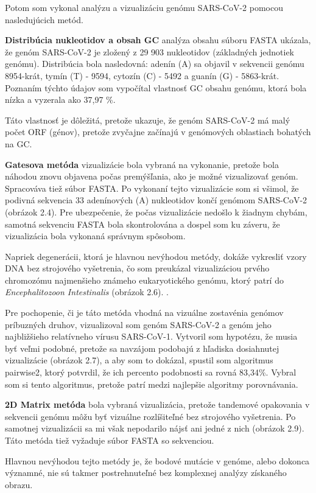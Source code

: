 Potom som vykonal analýzu a vizualizáciu genómu SARS-CoV-2 pomocou nasledujúcich metód.

\textbf{Distribúcia nukleotidov a obsah GC} analýza obsahu súboru FASTA ukázala, že genóm SARS-CoV-2 je zložený z 29 903 nukleotidov (základných jednotiek genómu).
Distribúcia bola nasledovná: adenín (A) sa objavil v sekvencii genómu 8954-krát, tymín (T) - 9594, cytozín (C) - 5492 a guanín (G) - 5863-krát.
Poznaním týchto údajov som vypočítal vlastnosť GC obsahu genómu, ktorá bola nízka a vyzerala ako 37,97 \%.

Táto vlastnosť je dôležitá, pretože ukazuje, že genóm SARS-CoV-2 má malý počet ORF (génov), pretože zvyčajne začínajú v genómových oblastiach bohatých na GC.

\textbf{Gatesova metóda} vizualizácie bola vybraná na vykonanie, pretože bola náhodou znovu objavena počas premýšľania, ako je možné vizualizovať genóm.
Spracováva tiež súbor FASTA.
Po vykonaní tejto vizualizácie som si všimol, že podivná sekvencia 33 adenínových (A) nukleotidov končí genómom SARS-CoV-2 (obrázok 2.4).
Pre ubezpečenie, že počas vizualizácie nedošlo k žiadnym chybám, samotná sekvenciu FASTA bola skontrolována a dospel som ku záveru, že vizualizácia bola vykonaná správnym spôsobom.
    
Napriek degenerácii, ktorá je hlavnou nevýhodou metódy, dokáže vykresliť vzory DNA bez strojového vyšetrenia, čo som preukázal vizualizáciou prvého chromozómu najmenšieho známeho eukaryotického genómu, ktorý patrí do \textit{Encephalitozoon Intestinalis} (obrázok 2.6). .

Pre pochopenie, či je táto metóda vhodná na vizuálne zostavénia genómov príbuzných druhov, vizualizoval som genóm SARS-CoV-2 a genóm jeho najbližšieho relatívneho vírusu SARS-CoV-1.
Vytvoril som hypotézu, že musia byť veľmi podobné, pretože sa navzájom podobajú z hľadiska dosiahnutej vizualizácie (obrázok 2.7), a aby som to dokázal, spustil som algoritmus pairwise2, ktorý potvrdil, že ich percento podobnosti sa rovná 83,34\%.
Vybral som si tento algoritmus, pretože patrí medzi najlepšie algoritmy porovnávania.

\textbf{2D Matrix metóda} bola vybraná vizualizácia, pretože tandemové opakovania v sekvencii genómu môžu byť vizuálne rozlíšiteľné bez strojového vyšetrenia.
Po samotnej vizualizácii sa mi však nepodarilo nájsť ani jedné z nich (obrázok 2.9).
Táto metóda tiež vyžaduje súbor FASTA so sekvenciou.

Hlavnou nevýhodou tejto metódy je, že bodové mutácie v genóme, alebo dokonca významné, nie sú takmer postrehnuteľné bez komplexnej analýzy získaného obrazu.

